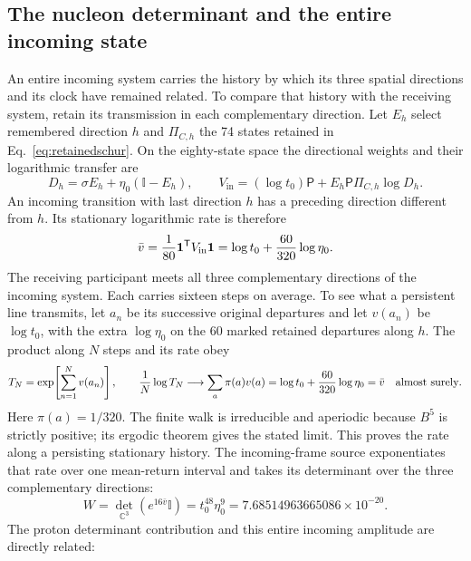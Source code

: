 \documentclass[aps,prx,onecolumn,10pt,notitlepage,nofootinbib,longbibliography]{revtex4-2}
\numberwithin{equation}{section}
\numberwithin{table}{section}
\newcommand{\Id}{\mathbb I}
\newcommand{\CC}{\mathbb C}
\begin{document}
\subsection{The nucleon determinant and the entire incoming state}
\label{sec:logtransfer}

An entire incoming system carries the history by which its three spatial directions and its clock have remained related. To compare that history with the receiving system, retain its transmission in each complementary direction. Let $E_h$ select remembered direction $h$ and $\Pi_{C,h}$ the 74 states retained in Eq.~\eqref{eq:retainedschur}. On the eighty-state space the directional weights and their logarithmic transfer are
\begin{equation}
 D_h=\sigma E_h+\eta_0(\Id-E_h),\qquad
 V_{\mathrm{in}}=(\log t_0)\mathsf P+E_h\mathsf P \Pi_{C,h}\log D_h.
 \label{eq:incoming}
\end{equation}
An incoming transition with last direction $h$ has a preceding direction different from $h$. Its stationary logarithmic rate is therefore
\begin{equation}
 \bar v=\frac1{80}{\bf1}^{\mathsf T}V_{\mathrm{in}}{\bf1}
 =\log t_0+\frac{60}{320}\log\eta_0.
\end{equation}
The receiving participant meets all three complementary directions of the incoming system. Each carries sixteen steps on average. To see what a persistent line transmits, let $a_n$ be its successive original departures and let $v(a_n)$ be $\log t_0$, with the extra $\log\eta_0$ on the $60$ marked retained departures along $h$. The product along $N$ steps and its rate obey
\begin{equation}
 T_N=\exp\!\left[\sum_{n=1}^Nv(a_n)\right],\qquad
 \frac1N\log T_N\longrightarrow
 \sum_a\pi(a)v(a)
 =\log t_0+\frac{60}{320}\log\eta_0=\bar v
 \quad\hbox{almost surely}.
 \label{eq:typicallogtransfer}
\end{equation}
Here $\pi(a)=1/320$. The finite walk is irreducible and aperiodic because $B^5$ is strictly positive; its ergodic theorem gives the stated limit. This proves the rate along a persisting stationary history. The incoming-frame source exponentiates that rate over one mean-return interval and takes its determinant over the three complementary directions:
\begin{equation}
 W=\det_{\CC^3}(e^{16\bar v}\Id)
 =t_0^{48}\eta_0^9=7.68514963665086\times10^{-20}.
 \label{eq:W}
\end{equation}
The proton determinant contribution and this entire incoming amplitude are directly related:
\end{document}
